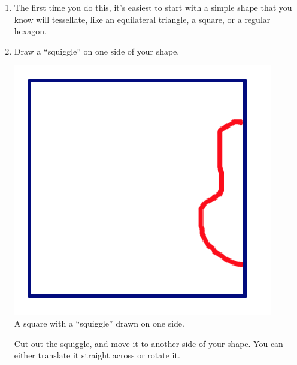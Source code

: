 \documentclass[12pt, reqno]{amsart}
\theoremstyle{remark}
\theoremstyle{definition}
\numberwithin{equation}{section}  %
\begin{document}
\begin{enumerate}

\item
The first time you do this, it's easiest to start with a simple shape that you know will tessellate, like an equilateral triangle, a square, or a regular hexagon.\\

\item
Draw a ``squiggle'' on one side of your shape.  

\begin{center}
\includegraphics[scale=0.5]{eschdirect1}\\
A square with a ``squiggle'' drawn on one side.

\end{center}
Cut out the squiggle, and move it to another side of your shape.  You can either translate it straight across or rotate it.  


\end{enumerate}
\end{document}
